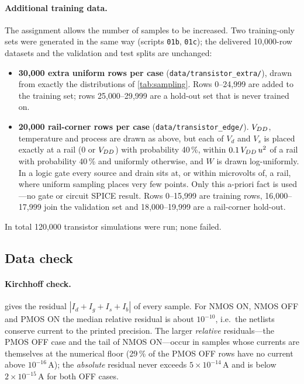 \paragraph{Additional training data.} The assignment allows the number of samples to be increased. Two training-only sets were generated in the same way
(scripts \texttt{01b}, \texttt{01c}); the delivered 10{,}000-row datasets and the validation and test splits are unchanged:
\begin{itemize}
  \item \textbf{30{,}000 extra uniform rows per case} (\texttt{data/transistor\_extra/}), drawn from exactly the distributions of \cref{tab:sampling}.
        Rows 0--24{,}999 are added to the training set; rows 25{,}000--29{,}999 are a hold-out set that is never trained on.
  \item \textbf{20{,}000 rail-corner rows per case} (\texttt{data/transistor\_edge/}). $V_{DD}$, temperature and process are drawn as above, but each of
        $V_d$ and $V_s$ is placed exactly at a rail (0 or $V_{DD}$) with probability 40\,\%, within $0.1\,V_{DD}\,u^2$ of a rail with probability 40\,\%
        and uniformly otherwise, and $W$ is drawn log-uniformly. In a logic gate every source and drain sits at, or within microvolts of, a rail,
        where uniform sampling places very few points. Only this a-priori fact is used---no gate or circuit SPICE result. Rows 0--15{,}999 are
        training rows, 16{,}000--17{,}999 join the validation set and 18{,}000--19{,}999 are a rail-corner hold-out.
\end{itemize}
In total 120{,}000 transistor simulations were run; none failed.

\subsection{Data check}
\paragraph{Kirchhoff check.}  gives the residual $|I_d+I_g+I_s+I_b|$ of every sample. For NMOS ON, NMOS OFF and PMOS ON the median
relative residual is about $10^{-10}$, i.e.\ the netlists conserve current to the printed precision. The larger \emph{relative} residuals---the PMOS
OFF case and the tail of NMOS ON---occur in samples whose currents are themselves at the numerical floor (29\,\% of the PMOS OFF rows have no current
above $10^{-16}$\,A); the \emph{absolute} residual never exceeds $5\times10^{-14}$\,A and is below $2\times10^{-15}$\,A for both OFF cases.


